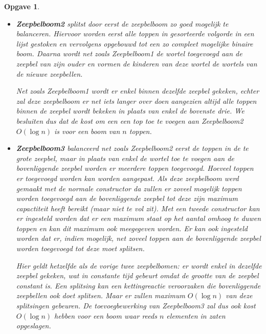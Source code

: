 \documentclass[12pt,hidelinks]{article}
\newtheorem{opgave}{Opgave}
\begin{document}
\begin{opgave}
\begin{enumerate}[a.]
\begin{itemize}
                        We kunnen dus concluderen dat voor Zeepbelboom1 met $n$ toppen de toevoegbewerking kost $O(\log n)$ heeft.

                    \item \textbf{Zeepbelboom2} splitst door eerst de zeepbelboom zo goed mogelijk te balanceren. 
                        Hiervoor worden eerst alle toppen in gesorteerde volgorde in een lijst gestoken en vervolgens opgebouwd tot een zo compleet mogelijke binaire boom. 
                        Daarna wordt net zoals Zeepbelboom1 de wortel toegevoegd aan de zeepbel van zijn ouder en vormen de kinderen van deze wortel de wortels van de nieuwe zeepbellen.

                        Net zoals Zeepbelboom1 wordt er enkel binnen dezelfde zeepbel gekeken, echter zal deze zeepbelboom er net iets langer over doen aangezien altijd alle toppen binnen de zeepbel wordt bekeken in plaats van enkel de bovenste drie. 
                        We besluiten dus dat de kost om een een top toe te voegen aan Zeepbelboom2 $O(\log n)$ is voor een boom van $n$ toppen.
                    \item \textbf{Zeepbelboom3} balanceerd net zoals Zeepbelboom2 eerst de toppen in de te grote zeepbel, maar in plaats van enkel de wortel toe te voegen aan de bovenliggende zeepbel worden er meerdere toppen toegevoegd.
                        Hoeveel toppen er toegevoegd worden kan worden aangepast. 
                        Als deze zeepbelboom werd gemaakt met de normale constructor da zullen er zoveel mogelijk toppen worden toegevoegd aan de bovenliggende zeepbel tot deze zijn maximum capactiteit heeft bereikt (maar niet te vol zit).
                        Met een tweede constructor kan er ingesteld worden dat er een maximum staat op het aantal omhoog te duwen toppen en kan dit maximum ook meegegeven worden.
                        Er kan ook ingesteld worden dat er, indien mogelijk, net zoveel toppen aan de bovenliggende zeepbel worden toegevoegd tot deze moet splitsen.

                        Hier geldt hetzelfde als de vorige twee zeepbelbomen: er wordt enkel in dezelfde zeepbel gekeken, wat in constante tijd gebeurt omdat de grootte van de zeepbel constant is.
                        Een splitsing kan een kettingreactie veroorzaken die bovenliggende zeepbellen ook doet splitsen. Maar er zullen maximum $O(\log n)$ van deze splitsingen gebeuren.
                        De toevoegbewerking van Zeepbelboom3 zal dus ook kost $O(\log n)$ hebben voor een boom waar reeds $n$ elementen in zaten
                        opgeslagen.
                \end{itemize}



\end{enumerate}
\end{opgave}
\end{document}
